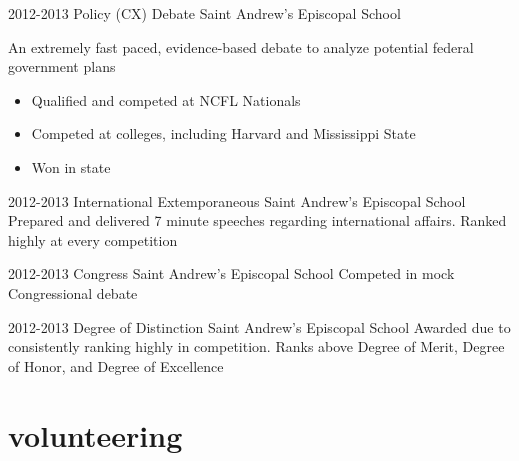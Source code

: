 \documentclass[]{friggeri-cv} %
\begin{document}
\begin{entrylist}


\entry
{2012-2013}
{Policy (CX) Debate}
{Saint Andrew's Episcopal School}
{An extremely fast paced, evidence-based debate to analyze potential federal government plans 
\begin{itemize} 
\item Qualified and competed at NCFL Nationals 
\item Competed at colleges, including Harvard and Mississippi State
\item Won  in state 
\end{itemize}
}


\entry
{2012-2013}
{International Extemporaneous}
{Saint Andrew's Episcopal School}
{Prepared and delivered 7 minute speeches regarding international affairs. Ranked highly at every competition}


\entry
{2012-2013}
{Congress}
{Saint Andrew's Episcopal School}
{Competed in mock Congressional debate}


\entry
{2012-2013}
{Degree of Distinction}
{Saint Andrew's Episcopal School}
{
Awarded due to consistently ranking highly in competition. Ranks above Degree of Merit, Degree of Honor, and Degree of Excellence}


\end{entrylist}



\section{volunteering}
\end{document}
